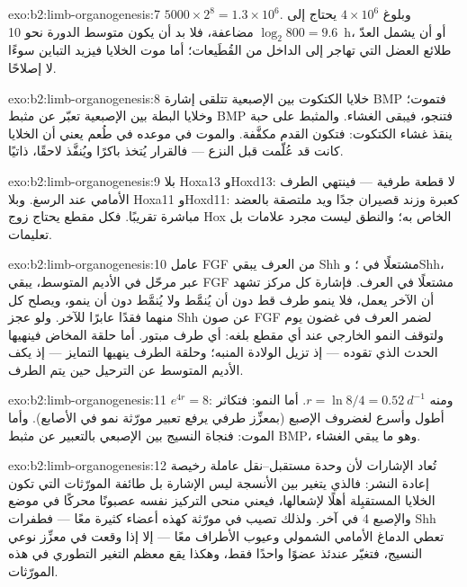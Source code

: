 \begin{solution}{exo:b2:limb-organogenesis:7}
$5000\times 2^{8} = 1.3\times 10^{6}$. وبلوغ $4\times 10^{6}$ يحتاج إلى
$\log_2 800 = 9.6$ مضاعفة، فلا بد أن يكون متوسط الدورة نحو
\qty{10}{h}، أو أن يشمل العدّ طلائع العضل التي
تهاجر إلى الداخل من القُطَيعات؛ أما موت الخلايا فيزيد التباين
سوءًا لا إصلاحًا.
\end{solution}

\begin{solution}{exo:b2:limb-organogenesis:8}
خلايا الكتكوت بين الإصبعية تتلقى إشارة BMP فتموت؛ وخلايا البطة
بين الإصبعية تعبّر عن مثبط BMP فتنجو، فيبقى الغشاء.
والمثبط على حبة ينقذ غشاء الكتكوت: فتكون القدم
مكفَّفة. والموت في موعده في طُعم يعني أن الخلايا كانت
قد عُلّمت قبل النزع --- فالقرار يُتخذ باكرًا
ويُنفَّذ لاحقًا، ذاتيًا.
\end{solution}

\begin{solution}{exo:b2:limb-organogenesis:9}
بلا Hoxa13 وHoxd13: لا قطعة طرفية --- فينتهي الطرف الأمامي عند
الرسغ. وبلا Hoxa11 وHoxd11: كعبرة وزند قصيران جدًا
ويد ملتصقة بالعضد مباشرة تقريبًا. فكل مقطع
يحتاج زوج Hox الخاص به؛ والنطق ليست مجرد علامات بل
تعليمات.
\end{solution}

\begin{solution}{exo:b2:limb-organogenesis:10}
عامل FGF من العرف يبقي Shh مشتعلًا في ؛ وShh، عبر مرحّل
في الأديم المتوسط، يبقي FGF مشتعلًا في العرف. فإشارة كل مركز
تشهد أن الآخر يعمل، فلا ينمو طرف قط دون
أن يُنمَّط ولا يُنمَّط دون أن ينمو، ويصلح كل منهما فقدًا
عابرًا للآخر. ولو عجز Shh عن صون
FGF لضمر العرف في غضون يوم ولتوقف النمو الخارجي
عند أي مقطع بلغه: أي طرف مبتور. أما حلقة
المخاض فينهيها الحدث الذي تقوده --- إذ تزيل الولادة
المنبه؛ وحلقة الطرف ينهيها التمايز --- إذ يكف
الأديم المتوسط عن الترحيل حين يتم الطرف.
\end{solution}

\begin{solution}{exo:b2:limb-organogenesis:11}
$e^{4r} = 8$: ومنه $r = \ln 8/4 = \qty{0.52}{d^{-1}}$. أما النمو:
فتكاثر أطول وأسرع لغضروف الإصبع (بمعزِّز طرفي
يرفع تعبير مورّثة نمو في الأصابع). وأما الموت: فنجاة
النسيج بين الإصبعي بالتعبير عن مثبط BMP،
وهو ما يبقي الغشاء.
\end{solution}

\begin{solution}{exo:b2:limb-organogenesis:12}
تُعاد الإشارات لأن وحدة مستقبل--نقل عاملة
رخيصة إعادة النشر: فالذي يتغير بين الأنسجة ليس
الإشارة بل طائفة المورّثات التي تكون الخلايا المستقبِلة أهلًا
لإشعالها، فيعني منحى التركيز نفسه عصبونًا محركًا في
موضع والإصبع 4 في آخر. ولذلك تصيب  في مورّثة كهذه
أعضاء كثيرة معًا --- فطفرات Shh تعطي
الدماغ الأمامي الشمولي وعيوب الأطراف معًا --- إلا إذا وقعت في
معزِّز نوعي النسيج، فتغيّر عندئذ عضوًا واحدًا فقط،
وهكذا يقع معظم التغير التطوري في هذه المورّثات.
\end{solution}

